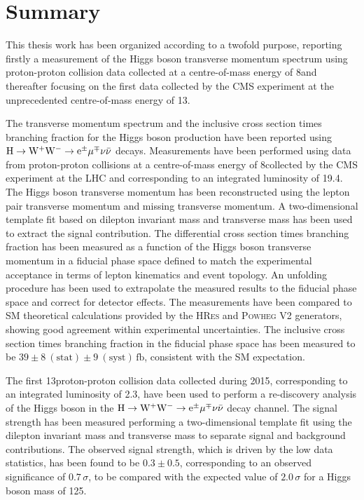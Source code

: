 \chapter*{Summary}
\thispagestyle{empty}

This thesis work has been organized according to a twofold purpose, reporting firstly a measurement of the Higgs boson transverse momentum spectrum using proton-proton collision data collected at a centre-of-mass energy of 8\TeV and thereafter focusing on the first data collected by the CMS experiment at the unprecedented centre-of-mass energy of 13\TeV.

The transverse momentum spectrum and the inclusive cross section times branching fraction for the Higgs boson production have been reported using $\rm{H}\to\rm{W^+W^-}\to e^{\pm} \mu^{\mp}\nu\bar{\nu}$ decays. Measurements have been performed using data from proton-proton collisions at a centre-of-mass energy of 8\TeV collected by the CMS experiment at the LHC and corresponding to an integrated luminosity of 19.4\ifb. The Higgs boson transverse momentum has been reconstructed using the lepton pair transverse momentum and missing transverse momentum. A two-dimensional template fit based on dilepton invariant mass and transverse mass has been used to extract the signal contribution. The differential cross section times branching fraction has been measured as a function of the Higgs boson transverse momentum in a fiducial phase space defined to match the experimental acceptance in terms of lepton kinematics and event topology. An unfolding procedure has been used to extrapolate the measured results to the fiducial phase space and correct for detector effects.
The measurements have been compared to SM theoretical calculations provided by the \textsc{HRes} and \textsc{Powheg V2} generators, showing good agreement within experimental uncertainties. The inclusive cross section times branching fraction in the fiducial phase space has been measured to be $39\pm 8~(\mathrm{stat}) \pm 9~(\mathrm{syst})\,\mathrm{fb}$, consistent with the SM expectation.

The first 13\TeV proton-proton collision data collected during 2015, corresponding to an integrated luminosity of 2.3\ifb, have been used to perform a re-discovery analysis of the Higgs boson in the $\rm{H}\to\rm{W^+W^-}\to e^{\pm} \mu^{\mp}\nu\bar{\nu}$ decay channel. The signal strength has been measured performing a two-dimensional template fit using the dilepton invariant mass and transverse mass to separate signal and background contributions.
The observed signal strength, which is driven by the low data statistics, has been found to be $0.3\pm0.5$, corresponding to an observed significance of $0.7\,\sigma$, to be compared with the expected value of $2.0\,\sigma$ for a Higgs boson mass of 125\GeV.

